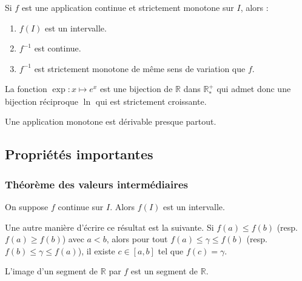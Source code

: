 	\begin{theorem}[Bijection]
		Si $f$ est une application continue et strictement monotone sur $I$, alors :
		\begin{enumerate}[label=(\roman*)]
			\item $f(I)$ est un intervalle.
			\item $f^{-1}$ est continue.
			\item $f^{-1}$ est strictement monotone de même sens de variation que $f$.
		\end{enumerate}
	\end{theorem}

	\begin{example}
		La fonction $\exp : x \mapsto e^x$ est une bijection de $\mathbb{R}$ dans $\mathbb{R}^{+}_{*}$ qui admet donc une bijection réciproque $\ln$ qui est strictement croissante.
	\end{example}


	\begin{theorem}[Lebesgue]
		Une application monotone est dérivable presque partout.
	\end{theorem}

	\newpage
	\subsection{Propriétés importantes}

	\subsubsection{Théorème des valeurs intermédiaires}


	\begin{theorem}
		On suppose $f$ continue sur $I$. Alors $f(I)$ est un intervalle.
	\end{theorem}

	\begin{remark}
		Une autre manière d'écrire ce résultat est la suivante. Si $f(a) \leq f(b)$ (resp. $f(a) \geq f(b)$) avec $a < b$, alors pour tout $f(a) \leq \gamma \leq f(b)$ (resp. $f(b) \leq \gamma \leq f(a)$), il existe $c \in [a,b]$ tel que $f(c) = \gamma$.
	\end{remark}

	\begin{corollary}
		L'image d'un segment de $\mathbb{R}$ par $f$ est un segment de $\mathbb{R}$.
	\end{corollary}

